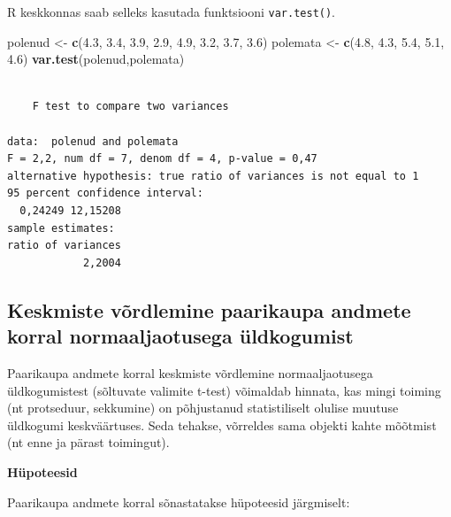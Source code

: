 \documentclass[
]{book}
\newenvironment{Shaded}{\begin{snugshade}}{\end{snugshade}}
\newcommand{\FloatTok}[1]{\textcolor[rgb]{0.00,0.00,0.81}{#1}}
\newcommand{\FunctionTok}[1]{\textcolor[rgb]{0.13,0.29,0.53}{\textbf{#1}}}
\newcommand{\NormalTok}[1]{#1}
\newcommand{\OtherTok}[1]{\textcolor[rgb]{0.56,0.35,0.01}{#1}}
\renewenvironment{Shaded} {\begin{snugshade}\footnotesize} {\end{snugshade}}
\begin{document}
R keskkonnas saab selleks kasutada funktsiooni \texttt{var.test()}.

\begin{Shaded}
\begin{Highlighting}[]
\NormalTok{polenud }\OtherTok{\textless{}{-}} \FunctionTok{c}\NormalTok{(}\FloatTok{4.3}\NormalTok{, }\FloatTok{3.4}\NormalTok{, }\FloatTok{3.9}\NormalTok{, }\FloatTok{2.9}\NormalTok{, }\FloatTok{4.9}\NormalTok{, }\FloatTok{3.2}\NormalTok{, }\FloatTok{3.7}\NormalTok{, }\FloatTok{3.6}\NormalTok{)}
\NormalTok{polemata }\OtherTok{\textless{}{-}} \FunctionTok{c}\NormalTok{(}\FloatTok{4.8}\NormalTok{, }\FloatTok{4.3}\NormalTok{, }\FloatTok{5.4}\NormalTok{, }\FloatTok{5.1}\NormalTok{, }\FloatTok{4.6}\NormalTok{)}
\FunctionTok{var.test}\NormalTok{(polenud,polemata)}
\end{Highlighting}
\end{Shaded}

\begin{verbatim}

    F test to compare two variances

data:  polenud and polemata
F = 2,2, num df = 7, denom df = 4, p-value = 0,47
alternative hypothesis: true ratio of variances is not equal to 1
95 percent confidence interval:
  0,24249 12,15208
sample estimates:
ratio of variances 
            2,2004 
\end{verbatim}

\subsection{Keskmiste võrdlemine paarikaupa andmete korral normaaljaotusega üldkogumist}\label{keskmiste-vuxf5rdlemine-paarikaupa-andmete-korral-normaaljaotusega-uxfcldkogumist}

Paarikaupa andmete korral keskmiste võrdlemine normaaljaotusega üldkogumistest (sõltuvate valimite t-test) võimaldab hinnata, kas mingi toiming (nt protseduur, sekkumine) on põhjustanud statistiliselt olulise muutuse üldkogumi keskväärtuses. Seda tehakse, võrreldes sama objekti kahte mõõtmist (nt enne ja pärast toimingut).

\textbf{Hüpoteesid}

Paarikaupa andmete korral sõnastatakse hüpoteesid järgmiselt:
\end{document}
